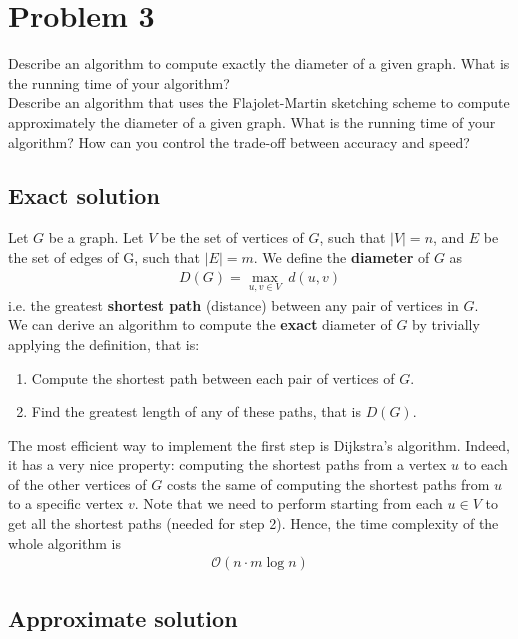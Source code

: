 
\section{Problem 3}

Describe an algorithm to compute exactly the diameter of a given graph. What is the running time of your algorithm?\\
Describe an algorithm that uses the Flajolet-Martin sketching scheme to compute approximately the diameter of a given graph.
What is the running time of your algorithm? How can you control the trade-off between accuracy and speed?

\subsection{Exact solution}

Let $G$ be a graph. Let $V$ be the set of vertices of $G$, such that $|V| = n$, and $E$ be the set of edges of G, such
that $|E| = m$. We define the \textbf{diameter} of $G$ as
\begin{align*}
D(G) = \max_{u,v \in V} \ d(u,v)
\end{align*}
i.e. the greatest \textbf{shortest path} (distance) between any pair of vertices in $G$.\\
We can derive an algorithm to compute the \textbf{exact} diameter of $G$ by trivially applying the definition, that is:
\begin{enumerate}
	\item Compute the shortest path between each pair of vertices of $G$. 
	\item Find the greatest length of any of these paths, that is $D(G)$.
\end{enumerate}
The most efficient way to implement the first step is Dijkstra's algorithm\cite{dijkstra}. Indeed, it has a very nice
property: computing the shortest paths from a vertex $u$ to each of the other vertices of $G$ costs the same of computing
the shortest paths from $u$ to a specific vertex $v$. Note that we need to perform \cite{dijkstra} starting from each
$u \in V$ to get all the shortest paths (needed for step 2). Hence, the time complexity of the whole algorithm is
\begin{align*}
\mathcal{O}(n \cdot m\log{n})
\end{align*}

\subsection{Approximate solution}


